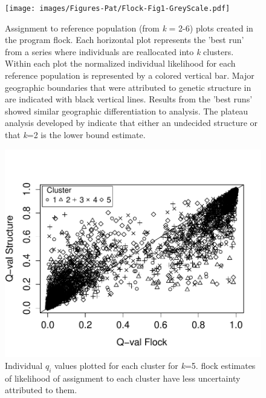 \begin{figure}
\begin{center}
    \texttt{[image: images/Figures-Pat/Flock-Fig1-GreyScale.pdf]} %
    \caption{Assignment to reference population (from \textit{k} = 2-6) plots created 
in the program {\sc flock}. Each horizontal plot represents the 'best run' from a 
series where individuals are reallocated into \textit{k} clusters. Within each plot 
the normalized individual likelihood for each reference population is represented by a 
colored vertical bar. Major geographic boundaries that were attributed to genetic 
structure in \citet{Garzaetal_norcal} are indicated with black vertical lines. Results 
from the 'best runs' showed similar geographic differentiation to 
\citet{Garzaetal_norcal} analysis. The plateau analysis developed by 
\citet{Duc&Tur2012} indicate that either an undecided structure or that \textit{k}=2 
is the lower bound estimate.}
    \label{Fig.1}
\end{center}
\end{figure}

\begin{figure}
\begin{center}
 \includegraphics[width=\textwidth]{images/Figures-Pat/Qval-1plotGreyScale.pdf}
    \caption{Individual \textit{$q_i$} values plotted for each cluster for \textit{k}=5. 
{\sc flock} estimates of likelihood of assignment to each cluster have less uncertainty
 attributed to them.}
    \label{Fig.2}
\end{center}
\end{figure}


